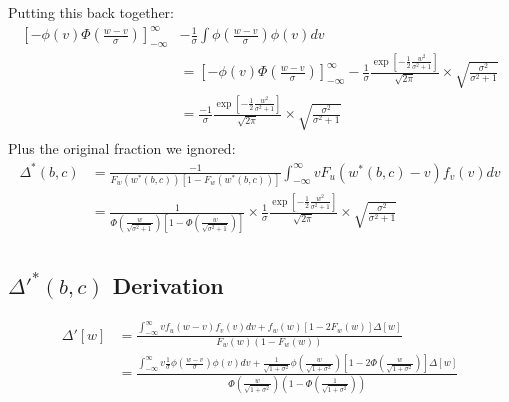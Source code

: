 \documentclass{article}
\begin{document}
Putting this back together:
\begin{align*}
 \left[
        -\phi(v) \Phi\left(\frac{w-v}{\sigma}\right) 
    \right]^\infty_{-\infty} &-\frac{1}{\sigma} \int \phi\left(\frac{w - v}{\sigma}\right) \phi(v) dv  
     \\
    &=
 \left[
        -\phi(v) \Phi\left(\frac{w-v}{\sigma}\right) 
    \right]^\infty_{-\infty} -
    \frac{1}{\sigma} \frac{
        \exp \left[
            -\frac{1}{2}\frac{w^2}{\sigma^2 + 1}
        \right]
    }{\sqrt{2\pi}} \times 
                    \sqrt{
                        \frac{\sigma^2}{\sigma^2 + 1}
                    }  \\
&=
    \frac{-1}{\sigma} \frac{
        \exp \left[
            -\frac{1}{2}\frac{w^2}{\sigma^2 + 1}
        \right]
    }{\sqrt{2\pi}} \times 
                    \sqrt{
                        \frac{\sigma^2}{\sigma^2 + 1}
                    }  \\
\end{align*}
Plus the original fraction we ignored:
\begin{align*}
    \Delta^*(b,c) &= \frac{
        -1
    }{
        F_w(w^*(b,c)) [1 - F_w(w^*(b,c))]
    } \int^\infty_{-\infty} vF_u(w^*(b,c) - v) f_v(v) dv \\
     &= 
\frac{
        1
    }{
        \Phi\left(\frac{w}{\sqrt{\sigma^2 + 1}}\right)
         \left[1 - \Phi\left(\frac{
            w
        }{
            \sqrt{\sigma^2 + 1}
        }\right)\right]
    } \times 
    \frac{1}{\sigma} \frac{
        \exp \left[
            -\frac{1}{2}\frac{w^2}{\sigma^2 + 1}
        \right]
    }{\sqrt{2\pi}} \times 
                    \sqrt{
                        \frac{\sigma^2}{\sigma^2 + 1}
                    }  \\
\end{align*}

\subsection*{$\Delta'^*(b,c)$ Derivation}

\begin{align*}
   \Delta'[w] &= 
   \frac{
    \int^\infty_{-\infty} v f_u(w - v) f_v(v) dv 
    + f_w(w) \left[
        1 - 2 F_w(w)
    \right] \Delta[w]
   }{
    F_w(w)(1 - F_w(w))
   } \\
   &= 
   \frac{
    \int^\infty_{-\infty} v \frac{1}{\sigma}\phi\left(\frac{w - v}{\sigma}\right) \phi(v) dv 
    + \frac{1}{\sqrt{1 + \sigma^2}}\phi\left(\frac{w}{\sqrt{1 + \sigma^2}}\right) \left[
        1 - 2 \Phi(\frac{w}{\sqrt{1 + \sigma^2}})
    \right] \Delta[w]
   }{
    \Phi\left(\frac{w}{\sqrt{1 + \sigma^2}}\right)\left(1 - \Phi\left(\frac{1}{\sqrt{1 + \sigma^2}}\right)\right)
   } \\
\end{align*}
\end{document}
